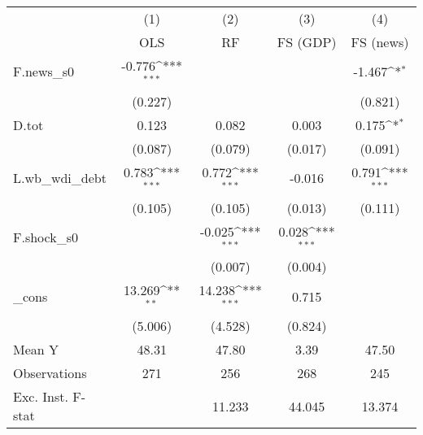 {
\def\sym#1{\ifmmode^{#1}\else\(^{#1}\)\fi}
\begin{tabular}{l*{4}{c}}
\toprule
            &\multicolumn{1}{c}{(1)}&\multicolumn{1}{c}{(2)}&\multicolumn{1}{c}{(3)}&\multicolumn{1}{c}{(4)}\\
            &\multicolumn{1}{c}{OLS}&\multicolumn{1}{c}{RF}&\multicolumn{1}{c}{FS (GDP)}&\multicolumn{1}{c}{FS (news)}\\
\midrule
F.news\_s0   &      -0.776\sym{***}&                     &                     &      -1.467\sym{*}  \\
            &     (0.227)         &                     &                     &     (0.821)         \\
\addlinespace
D.tot       &       0.123         &       0.082         &       0.003         &       0.175\sym{*}  \\
            &     (0.087)         &     (0.079)         &     (0.017)         &     (0.091)         \\
\addlinespace
L.wb\_wdi\_debt&       0.783\sym{***}&       0.772\sym{***}&      -0.016         &       0.791\sym{***}\\
            &     (0.105)         &     (0.105)         &     (0.013)         &     (0.111)         \\
\addlinespace
F.shock\_s0  &                     &      -0.025\sym{***}&       0.028\sym{***}&                     \\
            &                     &     (0.007)         &     (0.004)         &                     \\
\addlinespace
\_cons      &      13.269\sym{**} &      14.238\sym{***}&       0.715         &                     \\
            &     (5.006)         &     (4.528)         &     (0.824)         &                     \\
\midrule
Mean Y      &       48.31         &       47.80         &        3.39         &       47.50         \\
Observations&         271         &         256         &         268         &         245         \\
Exc. Inst. F-stat&                     &      11.233         &      44.045         &      13.374         \\
\bottomrule
\end{tabular}
}
